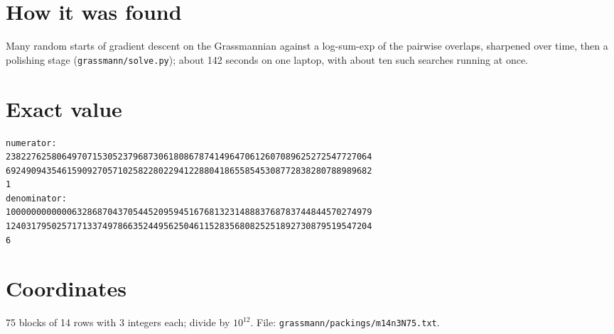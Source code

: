 \documentclass[11pt,a4paper]{article}
\begin{document}
\section{How it was found}
Many random starts of gradient descent on the Grassmannian against a log-sum-exp of the pairwise overlaps, sharpened over time, then a polishing stage (\texttt{grassmann/solve.py}); about 142 seconds on one laptop, with about ten such searches running at once.


\appendix
\section{Exact value}
{\small
\begin{verbatim}
numerator:
238227625806497071530523796873061808678741496470612607089625272547727064
692490943546159092705710258228022941228804186558545308772838280788989682
1
denominator:
100000000000063286870437054452095945167681323148883768783744844570274979
124031795025717133749786635244956250461152835680825251892730879519547204
6
\end{verbatim}}

\section{Coordinates}
75 blocks of 14 rows with 3 integers each; divide by $10^{12}$. File: \texttt{grassmann/packings/m14n3N75.txt}.
{\tiny
\begin{multicols}{3}
\end{multicols}}
\end{document}
